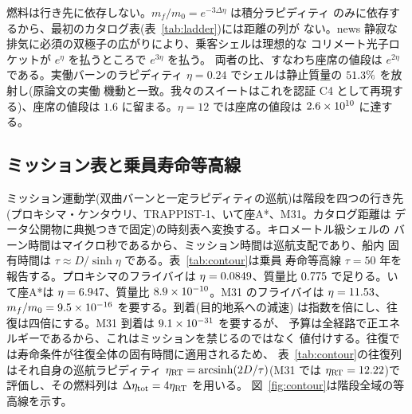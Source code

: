 \documentclass[11pt]{article}
\begin{document}
燃料は行き先に依存しない。$m_f/m_0 = e^{-3\Delta\eta}$ は積分ラピディティ
のみに依存するから、最初のカタログ表(表~\ref{tab:ladder})には距離の列が
ない。news 静寂な排気に必須の双極子の広がりにより、乗客シェルは理想的な
コリメート光子ロケットが $e^{\eta}$ を払うところで $e^{3\eta}$ を払う。
両者の比、すなわち座席の値段は $e^{2\eta}$ である。実働バーンのラピディティ
$\eta = 0.24$ でシェルは静止質量の $51.3\%$ を放射し(原論文の実働
機動と一致。我々のスイートはこれを認証 C4 として再現する)、座席の値段は
$1.6$ に留まる。$\eta = 12$ では座席の値段は $2.6\times10^{10}$ に達する。

\begin{table}[t]
\centering
\caption{ラピディティ階段(行き先非依存、全行 [R])。$1-\beta$ 列は
$\beta$ の表示桁が飽和する光速接近を分解する。座席の値段は理想コリメート
光子ロケットに対する初期質量比である。}
\label{tab:ladder}

\end{table}

\subsection{ミッション表と乗員寿命等高線}

ミッション運動学(双曲バーンと一定ラピディティの巡航)は階段を四つの行き先
(プロキシマ・ケンタウリ、TRAPPIST-1、いて座A*、M31。カタログ距離は
データ公開物に典拠つきで固定)の時刻表へ変換する。キロメートル級シェルの
バーン時間はマイクロ秒であるから、ミッション時間は巡航支配であり、船内
固有時間は $\tau \approx D/\sinh\eta$ である。表~\ref{tab:contour}は乗員
寿命等高線 $\tau = 50$ 年を報告する。プロキシマのフライバイは
$\eta = 0.0849$、質量比 $0.775$ で足りる。いて座A*は
$\eta = 6.947$、質量比 $8.9\times10^{-10}$。M31 のフライバイは
$\eta = 11.53$、$m_f/m_0 = 9.5\times10^{-16}$ を要する。到着(目的地系への減速)
は指数を倍にし、往復は四倍にする。M31 到着は $9.1\times10^{-31}$ を要するが、
予算は全経路で正エネルギーであるから、これはミッションを禁じるのではなく
値付けする。往復では寿命条件が往復全体の固有時間に適用されるため、
表~\ref{tab:contour}の往復列はそれ自身の巡航ラピディティ
$\eta_{\rm RT} = {\rm arcsinh}(2D/\tau)$(M31 では
$\eta_{\rm RT} = 12.22$)で評価し、その燃料列は
$\Delta\eta_{\rm tot} = 4\eta_{\rm RT}$ を用いる。
図~\ref{fig:contour}は階段全域の等高線を示す。

\begin{table}[t]
\centering
\caption{乗員寿命等高線($\tau = 50$ 年、船内固有時間。バーンは厳密に算入、
巡航支配)。フライバイと到着の列は $\eta_{50} = {\rm arcsinh}(D/\tau)$ を
共有し、往復列はそれ自身の $\eta_{\rm RT} = {\rm arcsinh}(2D/\tau)$、
すなわち往復全体の固有時間が等高線に達するラピディティで評価する。燃料列は
$m_f/m_0 = e^{-3\Delta\eta_{\rm tot}}$、$\Delta\eta_{\rm tot} = \eta_{50},
2\eta_{50}, 4\eta_{\rm RT}$ である。}
\label{tab:contour}

\end{table}
\end{document}
